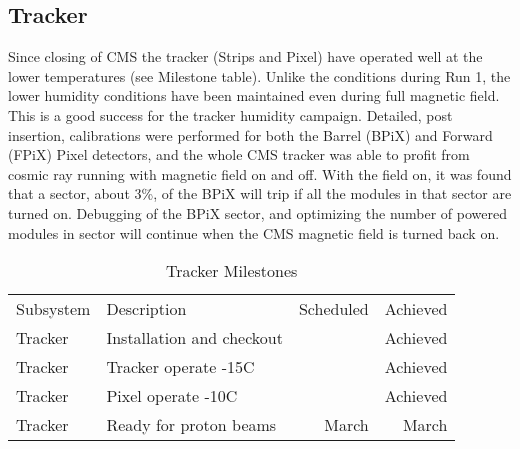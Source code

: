 \subsection{Tracker}
Since closing of CMS the tracker (Strips and Pixel) have operated well at the lower temperatures (see
Milestone table). Unlike the conditions during Run 1, the lower humidity conditions have been maintained
even during full magnetic field. This is a good success for the tracker humidity campaign. Detailed, post insertion,
calibrations were performed for both the Barrel (BPiX) and Forward (FPiX) Pixel detectors, and the whole CMS
tracker was able to profit from cosmic ray running with magnetic field on and off. With the field
on, it was found that a sector, about 3\%, of the BPiX will trip if all the modules in that sector are turned on.
Debugging of the BPiX sector, and optimizing the number of powered modules in sector will continue when
the CMS magnetic field is turned back on.
\begin{table}[htp]
\caption{Tracker Milestones}
\begin{center}
\begin{tabular}{|l|l|r|r|}
\hline
Subsystem&Description&Scheduled&Achieved\\

Tracker & Installation and checkout& & Achieved\\
\hline
Tracker & Tracker operate -15C & & Achieved\\
\hline
Tracker & Pixel operate -10C & & Achieved\\
\hline
Tracker& Ready for proton beams& March & March\\
\hline
\end{tabular}
\end{center}
\label{TrackerMilestones}
\end{table}


